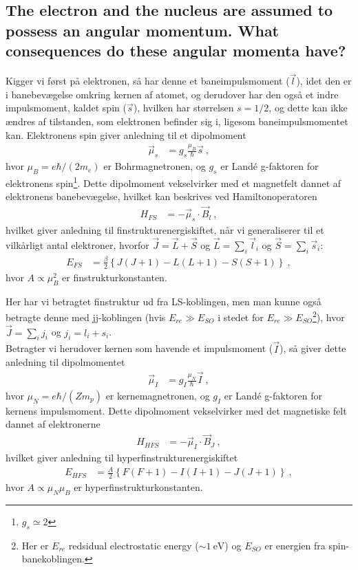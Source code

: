\subsection{The electron and the nucleus are assumed to possess an angular momentum. What consequences do these angular momenta have?}


Kigger vi først på elektronen, så har denne et baneimpulsmoment ($\Vec{l}$), idet den er i banebevægelse omkring kernen af atomet, og derudover har den også et indre impulsmoment, kaldet spin ($\Vec{s}$), hvilken har størrelsen $s = 1/2$, og dette kan ikke ændres af tilstanden, som elektronen befinder sig i, ligesom baneimpulsmomentet kan. Elektronens spin giver anledning til et dipolmoment
\begin{align}
    \Vec{\mu}_s &= g_s \frac{\mu_B}{\hbar}\Vec{s} \: ,
\end{align}
hvor $\mu_B = e\hbar/(2m_e)$ er Bohrmagnetronen, og $g_s$ er Landé g-faktoren for elektronens spin\footnote{$g_s \simeq 2$}. Dette dipolmoment vekselvirker med et magnetfelt dannet af elektronens banebevægelse, hvilket kan beskrives ved Hamiltonoperatoren
\begin{align}
    H_{FS} &= - \Vec{\mu}_s \cdot \Vec{B}_l \: ,
\end{align}
hvilket giver anledning til finstrukturenergiskiftet, når vi generaliserer til et vilkårligt antal elektroner, hvorfor $\Vec{J} = \Vec{L} + \Vec{S}$ og $\Vec{L} = \sum_i \Vec{l}_i$ og $\Vec{S} = \sum_i \Vec{s}_i$:
\begin{align}
    E_{FS} &= \frac{\beta}{2} \left\{J(J+1) - L(L+1) - S(S+1)\right\} \: ,
\end{align}
hvor $A \propto \mu_B^2$ er finstrukturkonstanten.

Her har vi betragtet finstruktur ud fra LS-koblingen, men man kunne også betragte denne med jj-koblingen (hvis $E_{re} \gg E_{SO}$ i stedet for $E_{re} \gg E_{SO}$\footnote{Her er $E_{re}$ redsidual electrostatic energy ($\sim \SI{1}{\eV}$) og $E_{SO}$ er energien fra spin-banekoblingen.}), hvor $\Vec{J} = \sum_i j_i$ og $j_i = l_i + s_i$.\\

Betragter vi herudover kernen som havende et impulsmoment ($\Vec{I}$), så giver dette anledning til dipolmomentet
\begin{align}
    \Vec{\mu}_I &= g_I \frac{\mu_N}{\hbar}\Vec{I} \: ,
\end{align}
hvor $\mu_N = e\hbar/(Zm_p)$ er kernemagnetronen, og $g_I$ er Landé g-faktoren for kernens impulsmoment. Dette dipolmoment vekselvirker med det magnetiske felt dannet af elektronerne
\begin{align}
    H_{HFS} &= - \Vec{\mu}_I \cdot \Vec{B}_J \: ,
\end{align}
hvilket giver anledning til hyperfinstrukturenergiskiftet
\begin{align}
    E_{HFS} &= \frac{A}{2} \left\{F(F+1) - I(I+1) - J(J+1)\right\} \: ,
\end{align}
hvor $A \propto \mu_N \mu_B$ er hyperfinstrukturkonstanten.\\

